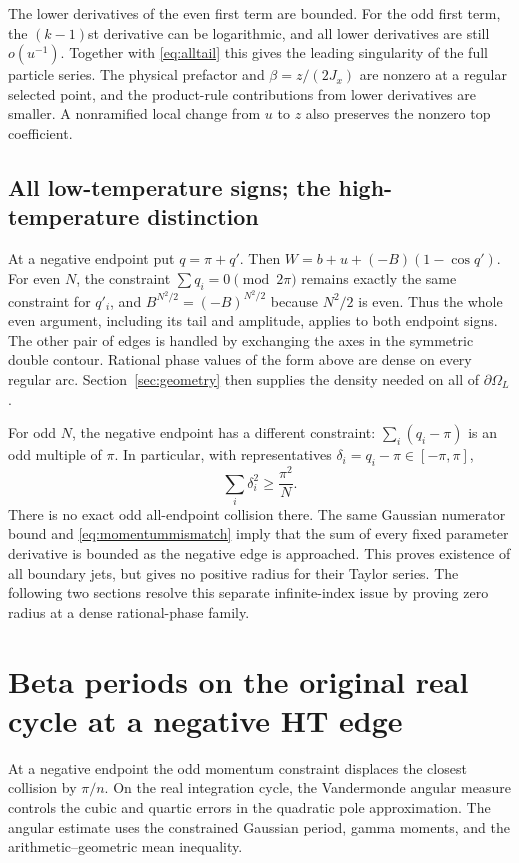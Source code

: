 \documentclass[11pt]{article}
\numberwithin{equation}{section}
\theoremstyle{definition}
\newcommand{\OL}{\Omega_L}
\begin{document}
The lower derivatives of the even first term are bounded. For the odd
first term, the $(k-1)$st derivative can be logarithmic, and all lower
derivatives are still $o(u^{-1})$. Together with
\eqref{eq:alltail} this gives the leading singularity of the full
particle series. The physical prefactor and $\beta=z/(2J_x)$ are
nonzero at a regular selected point, and the product-rule contributions
from lower derivatives are smaller. A nonramified local change from
$u$ to $z$ also preserves the nonzero top coefficient.

\subsection{All low-temperature signs; the high-temperature distinction}
At a negative endpoint put $q=\pi+q'$. Then
$W=b+u+(-B)(1-\cos q')$. For even $N$, the constraint
$\sum q_i=0\pmod{2\pi}$ remains exactly the same constraint for
$q'_i$, and $B^{N^2/2}=(-B)^{N^2/2}$ because $N^2/2$ is even.
Thus the whole even argument, including its tail and amplitude, applies
to both endpoint signs. The other pair of edges is handled by exchanging
the axes in the symmetric double contour. Rational phase values of the
form above are dense on every regular arc. Section~\ref{sec:geometry}
then supplies the density needed on all of $\partial\OL$.

For odd $N$, the negative endpoint has a different constraint:
$\sum_i(q_i-\pi)$ is an odd multiple of $\pi$. In particular, with
representatives $\delta_i=q_i-\pi\in[-\pi,\pi]$,
\begin{equation}\label{eq:momentummismatch}
 \sum_i\delta_i^2\ge\frac{\pi^2}{N}.
\end{equation}
There is no exact odd all-endpoint collision there. The same Gaussian
numerator bound and \eqref{eq:momentummismatch} imply that the sum of
every fixed parameter derivative is bounded as the negative edge is
approached. This proves existence of all boundary jets, but gives no
positive radius for their Taylor series. The following two sections
resolve this separate infinite-index issue by proving zero radius at
a dense rational-phase family.



\section{Beta periods on the original real cycle at a negative HT edge}
\label{sec:realcycle}

At a negative endpoint the odd momentum constraint displaces the closest
collision by $\pi/n$. On the real integration cycle, the Vandermonde
angular measure controls the cubic and quartic errors in the quadratic
pole approximation. The angular estimate uses the constrained Gaussian
period, gamma moments, and the arithmetic--geometric mean inequality.
\end{document}
